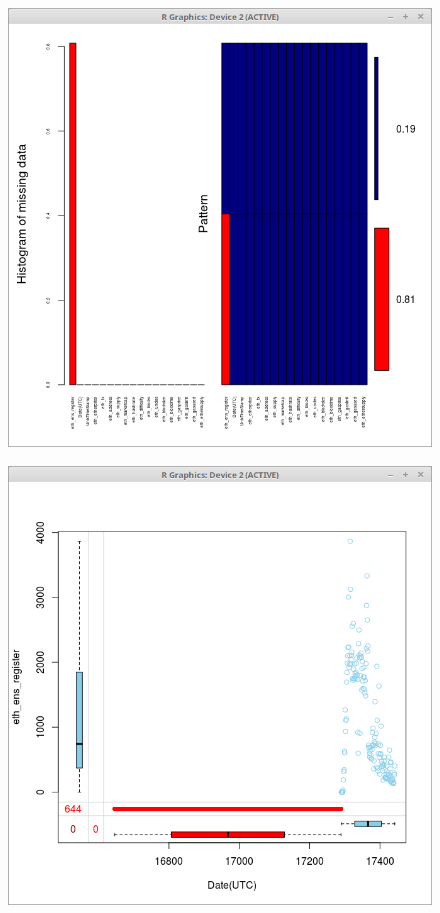 \documentclass{article}
\begin{document}
\begin{figure}
\centering
\begin{minipage}{.5\textwidth}
  \centering
  \includegraphics[width=.8\linewidth]{eth_dataset_missing}
  \label{fig:test1}
\end{minipage}%
\begin{minipage}{.5\textwidth}
  \centering
  \includegraphics[width=.8\linewidth]{eth_dataset_missing_box_plot}
  \label{fig:test2}
\end{minipage}
\end{figure}
\end{document}
